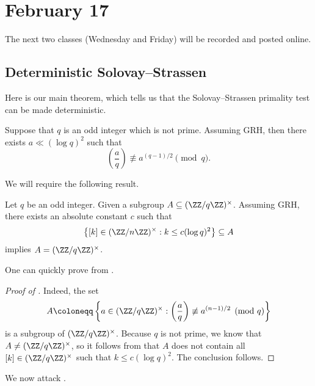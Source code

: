 \documentclass[../notes.tex]{subfiles}
\begin{document}
\section{February 17}

The next two classes (Wednesday and Friday) will be recorded and posted online.

\subsection{Deterministic Solovay--Strassen}
Here is our main theorem, which tells us that the Solovay--Strassen primality test can be made deterministic.
\begin{theorem} \label{thm:miller}
	Suppose that $q$ is an odd integer which is not prime. Assuming GRH, then there exists $a\ll(\log q)^2$ such that
	\[\left(\frac aq\right)\not\equiv a^{(q-1)/2}\pmod q.\]
\end{theorem}
We will require the following result.
\begin{proposition} \label{prop:get-subgroup-from-small}
	Let $q$ be an odd integer. Given a subgroup $A\subseteq(\ZZ/q\ZZ)^\times$. Assuming GRH, there exists an absolute constant $c$ such that
	\[\left\{[k]\in(\ZZ/n\ZZ)^\times:k\le c(\log q)^2\right\}\subseteq A\]
	implies $A=(\ZZ/q\ZZ)^\times$.
\end{proposition}
One can quickly prove  from .
\begin{proof}[Proof of ]
	Indeed, the set
	\[A\coloneqq\left\{a\in(\ZZ/q\ZZ)^\times:\left(\frac aq\right)\not\equiv a^{(n-1)/2}\pmod q\right\}\]
	is a subgroup of $(\ZZ/q\ZZ)^\times$. Because $q$ is not prime, we know that $A\ne(\ZZ/q\ZZ)^\times$, so it follows from  that $A$ does not contain all $[k]\in(\ZZ/q\ZZ)^\times$ such that $k\le c(\log q)^2$. The conclusion follows.
\end{proof}
We now attack .
\end{document}
